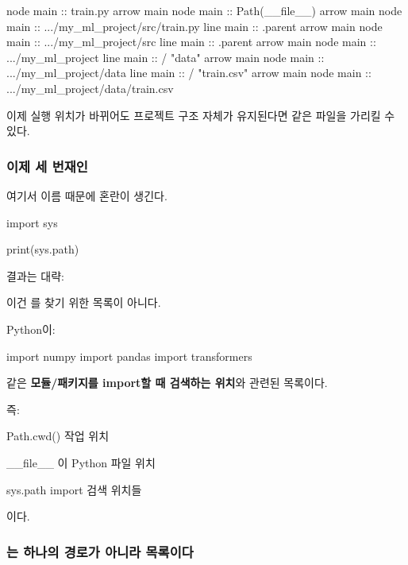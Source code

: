\begin{dhkbranch}[in=8]
node main :: train.py
arrow main
node main :: Path(__file__)
arrow main
node main :: .../my_ml_project/src/train.py
line main :: .parent
arrow main
node main :: .../my_ml_project/src
line main :: .parent
arrow main
node main :: .../my_ml_project
line main :: / "data"
arrow main
node main :: .../my_ml_project/data
line main :: / "train.csv"
arrow main
node main :: .../my_ml_project/data/train.csv
\end{dhkbranch}

이제 실행 위치가 바뀌어도 프로젝트 구조 자체가 유지된다면 같은 파일을 가리킬 수 있다.

\subsubsection{이제 세 번재인 }

여기서 이름 때문에 혼란이 생긴다.

\begin{dhkcode}
import sys

print(sys.path)
\end{dhkcode}

결과는 대략:

\begin{dhkzsh}
\end{dhkzsh}

이건 를 찾기 위한 목록이 아니다.

Python이:

\begin{dhkcode}
import numpy
import pandas
import transformers
\end{dhkcode}

같은 \textbf{모듈/패키지를 import할 때 검색하는 위치}와 관련된 목록이다.

즉:
\begin{dhknote}
\begin{dhksmry}[centered]
Path.cwd()
작업 위치

__file__
이 Python 파일 위치

sys.path
import 검색 위치들
\end{dhksmry}
\end{dhknote}
이다.

\subsubsection{는 하나의 경로가 아니라 목록이다}

